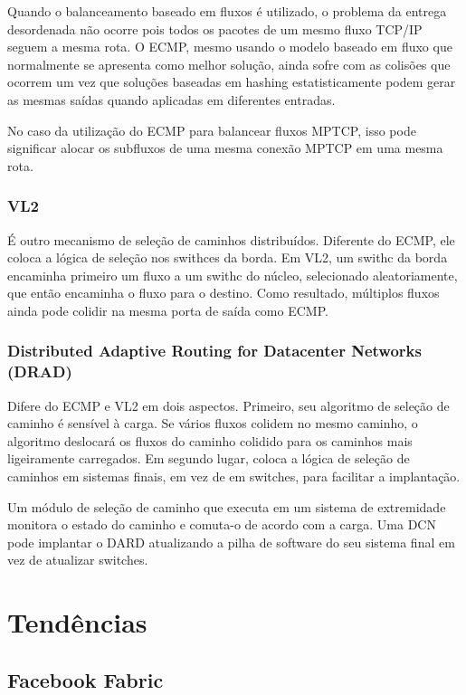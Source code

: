 \documentclass[12pt,a4paper]{report}
\begin{document}
  Quando o balanceamento baseado em fluxos é utilizado, o problema da entrega desordenada
  não ocorre pois todos os pacotes de um mesmo fluxo TCP/IP seguem a mesma rota.
  O ECMP, mesmo usando o modelo baseado em fluxo que normalmente se apresenta como 
  melhor solução, ainda sofre com as colisões que ocorrem
  um vez que soluções baseadas em hashing estatisticamente podem gerar as mesmas saídas
  quando aplicadas em diferentes entradas. 
  
  No caso da utilização do ECMP para balancear fluxos MPTCP, isso pode significar 
  alocar os subfluxos de uma mesma conexão MPTCP em uma mesma rota.

\subsection{VL2}

  É outro mecanismo de seleção de caminhos distribuídos. Diferente do ECMP,
  ele coloca a lógica de seleção nos swithces da borda. Em VL2, um swithc da borda
  encaminha primeiro um fluxo a um swithc do núcleo, selecionado aleatoriamente, que
  então encaminha o fluxo para o destino. Como resultado, múltiplos fluxos
  ainda pode colidir na mesma porta de saída como ECMP.

\subsection{Distributed Adaptive Routing for Datacenter Networks (DRAD)}

Difere do ECMP e VL2 em dois aspectos. Primeiro, seu algoritmo de seleção de caminho é
sensível à carga. Se vários fluxos colidem no mesmo caminho, o algoritmo deslocará os fluxos do caminho colidido
para os caminhos mais ligeiramente carregados. Em segundo lugar, coloca a lógica de seleção de
caminhos em sistemas finais, em vez de em switches, para facilitar a implantação. 

Um módulo de seleção de caminho que executa em um sistema de extremidade monitora
o estado do caminho e comuta-o de acordo com a carga. 
Uma DCN pode implantar o DARD atualizando a pilha de software do seu sistema final em vez de atualizar switches.

\chapter{Tendências}

\section{Facebook Fabric}
\end{document}
